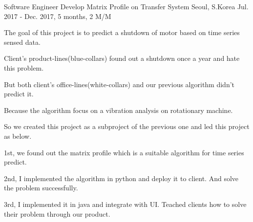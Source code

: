 \begin{cventries}
  \cventry
    {Software Engineer} %
    {Develop Matrix Profile on Transfer System} %
    {Seoul, S.Korea} %
    {Jul. 2017 - Dec. 2017, 5 months, 2 M/M} %
    {
      \begin{cvitems} %
        \item {The goal of this project is to predict a shutdown of motor based on time series sensed data.}
        \item {Client's product-lines(blue-collars) found out a shutdown once a year and hate this problem.}
        \item {But both client's office-lines(white-collars) and our previous algorithm didn't predict it.}
        \item {Because the algorithm focus on a vibration analysis on rotationary machine.}
        \item {So we created this project as a subproject of the previous one and led this project as below.}
        \item {1st, we found out the matrix profile which is a suitable algorithm for time series predict.}        
        \item {2nd, I implemented the algorithm in python and deploy it to client. And solve the problem successfully.}
        \item {3rd, I implemented it in java and integrate with UI. Teached clients how to solve their problem through our product.}
      \end{cvitems}
    }
\end{cventries}
